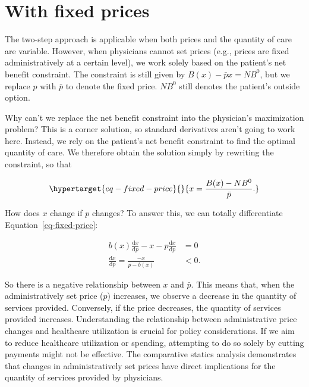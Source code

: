 \documentclass[
  letterpaper,
  DIV=11,
  numbers=noendperiod]{scrreport}
\theoremstyle{definition}
\theoremstyle{remark}
\begin{document}
\hypertarget{with-fixed-prices}{%
\section{With fixed prices}\label{with-fixed-prices}}

The two-step approach is applicable when both prices and the quantity of
care are variable. However, when physicians cannot set prices (e.g.,
prices are fixed administratively at a certain level), we work solely
based on the patient's net benefit constraint. The constraint is still
given by \(B(x) - \bar{p}x = NB^{0}\), but we replace \(p\) with
\(\bar{p}\) to denote the fixed price. \(NB^{0}\) still denotes the
patient's outside option.

Why can't we replace the net benefit constraint into the physician's
maximization problem? This is a corner solution, so standard derivatives
aren't going to work here. Instead, we rely on the patient's net benefit
constraint to find the optimal quantity of care. We therefore obtain the
solution simply by rewriting the constraint, so that

\begin{equation}\protect\hypertarget{eq-fixed-price}{}{x= \frac{B(x) - NB^{0}}{\bar{p}}.}\label{eq-fixed-price}\end{equation}

How does \(x\) change if \(p\) changes? To answer this, we can totally
differentiate Equation~\ref{eq-fixed-price}:

\[\begin{align*}
b(x)\frac{\mathrm{d}x}{\mathrm{d}p} - x - p\frac{\mathrm{d}x}{\mathrm{d}p} &= 0 \\
\frac{\mathrm{d}x}{\mathrm{d}p} = \frac{-x}{p-b(x)} &< 0.
\end{align*}\]

So there is a negative relationship between \(x\) and \(\bar{p}\). This
means that, when the administratively set price (\(p\)) increases, we
observe a decrease in the quantity of services provided. Conversely, if
the price decreases, the quantity of services provided increases.
Understanding the relationship between administrative price changes and
healthcare utilization is crucial for policy considerations. If we aim
to reduce healthcare utilization or spending, attempting to do so solely
by cutting payments might not be effective. The comparative statics
analysis demonstrates that changes in administratively set prices have
direct implications for the quantity of services provided by physicians.
\end{document}
